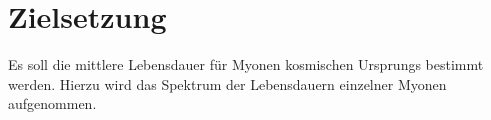 
\section{Zielsetzung}
\label{sec:Zielsetzung}
Es soll die mittlere Lebensdauer für Myonen kosmischen Ursprungs bestimmt werden. Hierzu wird das Spektrum der Lebensdauern einzelner Myonen aufgenommen.
